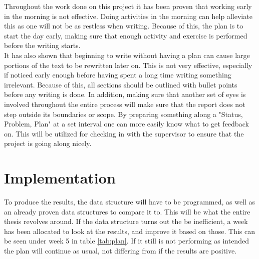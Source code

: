Throughout the work done on this project it has been proven that working early in the morning is not effective. Doing activities in the morning can help alleviate this as one will not be as restless when writing. Because of this, the plan is to start the day early, making sure that enough activity and exercise is performed before the writing starts. \\

It has also shown that beginning to write without having a plan can cause large portions of the text to be rewritten later on. This is not very effective, especially if noticed early enough before having spent a long time writing something irrelevant. Because of this, all sections should be outlined with bullet points before any writing is done. In addition, making sure that another set of eyes is involved throughout the entire process will make sure that the report does not step outside its boundaries or scope. By preparing something along a "Status, Problem, Plan" at a set interval one can more easily know what to get feedback on. This will be utilized for checking in with the supervisor to ensure that the project is going along nicely.

\section{Implementation}
To produce the results, the data structure will have to be programmed, as well as an already proven data structures to compare it to. This will be what the entire thesis revolves around. If the data structure turns out the be inefficient, a week has been allocated to look at the results, and improve it based on those. This can be seen under week 5 in table \ref{tab:plan}. If it still is not performing as intended the plan will continue as usual, not differing from if the results are positive.

